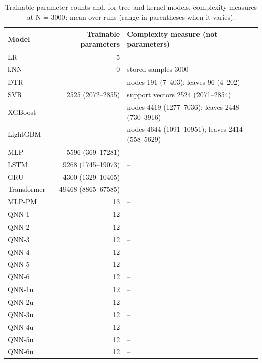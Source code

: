 \begin{table}[htbp]
\centering
\small
\caption{Trainable parameter counts and, for tree and kernel models, complexity measures at N = 3000: mean over runs (range in parentheses when it varies).}
\label{tab:t8}
\begin{tabular}{lrl}
\toprule
Model & Trainable parameters & Complexity measure (not parameters) \\
\midrule
LR & 5 & -- \\
kNN & 0 & stored samples 3000 \\
DTR & -- & nodes 191 (7--403); leaves 96 (4--202) \\
SVR & 2525 (2072--2855) & support vectors 2524 (2071--2854) \\
XGBoost & -- & nodes 4419 (1277--7036); leaves 2448 (730--3916) \\
LightGBM & -- & nodes 4644 (1091--10951); leaves 2414 (558--5629) \\
MLP & 5596 (369--17281) & -- \\
LSTM & 9268 (1745--19073) & -- \\
GRU & 4300 (1329--10465) & -- \\
Transformer & 49468 (8865--67585) & -- \\
MLP-PM & 13 & -- \\
QNN-1 & 12 & -- \\
QNN-2 & 12 & -- \\
QNN-3 & 12 & -- \\
QNN-4 & 12 & -- \\
QNN-5 & 12 & -- \\
QNN-6 & 12 & -- \\
QNN-1u & 12 & -- \\
QNN-2u & 12 & -- \\
QNN-3u & 12 & -- \\
QNN-4u & 12 & -- \\
QNN-5u & 12 & -- \\
QNN-6u & 12 & -- \\
\bottomrule
\end{tabular}
\par{}
\end{table}
